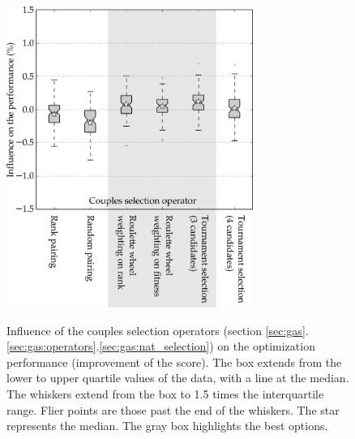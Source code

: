 \documentclass{ametsoc}
\begin{document}
\begin{figure}[t]
	\begin{center}
		\noindent\includegraphics[width=19pc,angle=0]{fig05.pdf}\\
	\end{center}
	\caption{Influence of the couples selection operators (section \ref{sec:gas}.\ref{sec:gas:operators}.\ref{sec:gas:nat_selection}) on the optimization performance (improvement of the score). The box extends from the lower to upper quartile values of the data, with a line at the median. The whiskers extend from the box to 1.5 times the interquartile range. Flier points are those past the end of the whiskers. The star represents the median. The gray box highlights the best options.}
	\label{fig:operator_selectcoupl_score}
\end{figure}
\end{document}
